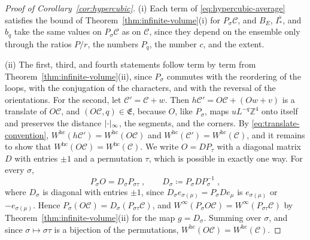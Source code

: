 \documentclass[11pt]{preprint}
\DeclarePairedDelimiter{\abs}{\lvert}{\rvert}
\numberwithin{equation}{section}
\theoremstyle{definition}
\theoremstyle{remark}
\theoremstyle{plain}
\begin{document}
\begin{proof}[Proof of Corollary~\ref{cor:hypercubic}]
(i) Each term of \eqref{eq:hypercubic-average} satisfies the bound of Theorem~\ref{thm:infinite-volume}(i) for $P_\sigma\mathcal C$, and $B_E$, $I^\flat_*$, and $b_q$ take the same values on $P_\sigma\mathcal C$ as on $\mathcal C$, since they depend on the ensemble only through the ratios $P/r$, the numbers $P_q$, the number $c$, and the extent.

(ii) The first, third, and fourth statements follow term by term from Theorem~\ref{thm:infinite-volume}(ii), since $P_\sigma$ commutes with the reordering of the loops, with the conjugation of the characters, and with the reversal of the orientations. For the second, let $\mathcal C' = \mathcal C + w$. Then $h\mathcal C' = O\mathcal C + (Ow + v)$ is a translate of $O\mathcal C$, and $(O\mathcal C, q) \in \mathfrak E$, because $O$, like $P_\sigma$, maps $uL^{-q}\mathbb Z^4$ onto itself and preserves the distance $\abs{\cdot}_\infty$, the segments, and the corners. By \eqref{eq:translate-convention}, $W^{\mathrm{hc}}(h\mathcal C') = W^{\mathrm{hc}}(O\mathcal C)$ and $W^{\mathrm{hc}}(\mathcal C') = W^{\mathrm{hc}}(\mathcal C)$, and it remains to show that $W^{\mathrm{hc}}(O\mathcal C) = W^{\mathrm{hc}}(\mathcal C)$. We write $O = DP_\tau$ with a diagonal matrix $D$ with entries $\pm1$ and a permutation $\tau$, which is possible in exactly one way. For every $\sigma$,
\begin{equation}\label{eq:permuted-symmetry}
    P_\sigma O = D_\sigma P_{\sigma\tau}\;,
    \qquad
    D_\sigma \coloneqq P_\sigma DP_\sigma^{-1}\;,
\end{equation}
where $D_\sigma$ is diagonal with entries $\pm1$, since $D_\sigma e_{\sigma(\mu)} = P_\sigma De_\mu$ is $e_{\sigma(\mu)}$ or $-e_{\sigma(\mu)}$. Hence $P_\sigma(O\mathcal C) = D_\sigma(P_{\sigma\tau}\mathcal C)$, and $W^\infty(P_\sigma O\mathcal C) = W^\infty(P_{\sigma\tau}\mathcal C)$ by Theorem~\ref{thm:infinite-volume}(ii) for the map $g = D_\sigma$. Summing over $\sigma$, and since $\sigma \mapsto \sigma\tau$ is a bijection of the permutations, $W^{\mathrm{hc}}(O\mathcal C) = W^{\mathrm{hc}}(\mathcal C)$.


\end{proof}
\end{document}
